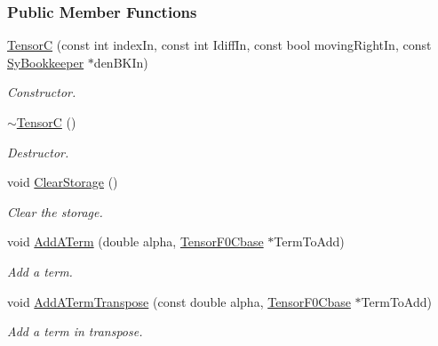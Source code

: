 \subsubsection*{Public Member Functions}
\begin{DoxyCompactItemize}
\item 
\hyperlink{classCheMPS2_1_1TensorC_ab1a8edcfe39fdae435608c9c4d85d5da}{Tensor\-C} (const int index\-In, const int Idiff\-In, const bool moving\-Right\-In, const \hyperlink{classCheMPS2_1_1SyBookkeeper}{Sy\-Bookkeeper} $\ast$den\-B\-K\-In)
\begin{DoxyCompactList}\small\item\em Constructor. \end{DoxyCompactList}\item 
\hypertarget{classCheMPS2_1_1TensorC_a49eac966c06522f40849712b6cdcde60}{\hyperlink{classCheMPS2_1_1TensorC_a49eac966c06522f40849712b6cdcde60}{$\sim$\-Tensor\-C} ()}\label{classCheMPS2_1_1TensorC_a49eac966c06522f40849712b6cdcde60}

\begin{DoxyCompactList}\small\item\em Destructor. \end{DoxyCompactList}\item 
\hypertarget{classCheMPS2_1_1TensorC_ab91ebced267050ea37b3bacbcf08ac6e}{void \hyperlink{classCheMPS2_1_1TensorC_ab91ebced267050ea37b3bacbcf08ac6e}{Clear\-Storage} ()}\label{classCheMPS2_1_1TensorC_ab91ebced267050ea37b3bacbcf08ac6e}

\begin{DoxyCompactList}\small\item\em Clear the storage. \end{DoxyCompactList}\item 
void \hyperlink{classCheMPS2_1_1TensorC_a1482dc7ffa3a50ee3e550b764424ce03}{Add\-A\-Term} (double alpha, \hyperlink{classCheMPS2_1_1TensorF0Cbase}{Tensor\-F0\-Cbase} $\ast$Term\-To\-Add)
\begin{DoxyCompactList}\small\item\em Add a term. \end{DoxyCompactList}\item 
void \hyperlink{classCheMPS2_1_1TensorC_a59ecea30bb4eb5c3ff634999931bcb5c}{Add\-A\-Term\-Transpose} (const double alpha, \hyperlink{classCheMPS2_1_1TensorF0Cbase}{Tensor\-F0\-Cbase} $\ast$Term\-To\-Add)
\begin{DoxyCompactList}\small\item\em Add a term in transpose. \end{DoxyCompactList}\end{DoxyCompactItemize}
